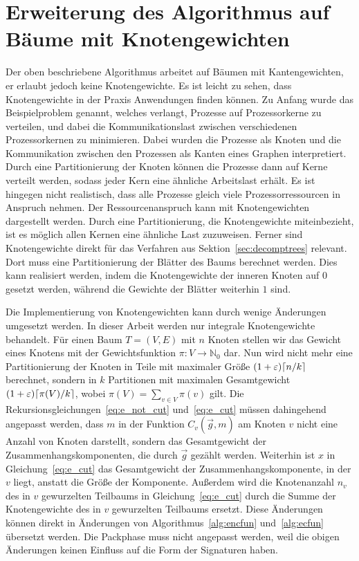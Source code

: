 \section{Erweiterung des Algorithmus auf Bäume mit Knotengewichten}\label{sec:nodeweights}
Der oben beschriebene Algorithmus arbeitet auf Bäumen mit Kantengewichten, er erlaubt jedoch keine Knotengewichte.
Es ist leicht zu sehen, dass Knotengewichte in der Praxis Anwendungen finden können.
Zu Anfang wurde das Beispielproblem genannt, welches verlangt, Prozesse auf Prozessorkerne zu verteilen, und dabei die Kommunikationslast zwischen verschiedenen Prozessorkernen zu minimieren.
Dabei wurden die Prozesse als Knoten und die Kommunikation zwischen den Prozessen als Kanten eines Graphen interpretiert.
Durch eine Partitionierung der Knoten können die Prozesse dann auf Kerne verteilt werden, sodass jeder Kern eine ähnliche Arbeitslast erhält.
Es ist hingegen nicht realistisch, dass alle Prozesse gleich viele Prozessorressourcen in Anspruch nehmen.
Der Ressourcenanspruch kann mit Knotengewichten dargestellt werden. 
Durch eine Partitionierung, die Knotengewichte miteinbezieht, ist es möglich allen Kernen eine ähnliche Last zuzuweisen.
Ferner sind Knotengewichte direkt für das Verfahren aus Sektion~\ref{sec:decomptrees} relevant. 
Dort muss eine Partitionierung der Blätter des Baums berechnet werden.
Dies kann realisiert werden, indem die Knotengewichte der inneren Knoten auf $0$ gesetzt werden, während die Gewichte der Blätter weiterhin $1$ sind.

Die Implementierung von Knotengewichten kann durch wenige Änderungen umgesetzt werden.
In dieser Arbeit werden nur integrale Knotengewichte behandelt.
Für einen Baum $T=(V,E)$ mit $n$ Knoten stellen wir das Gewicht eines Knotens mit der Gewichtsfunktion $\pi : V \rightarrow \mathbb{N}_0$ dar.
Nun wird nicht mehr eine Partitionierung der Knoten in Teile mit maximaler Größe $(1+\varepsilon) \lceil n/k\rceil$ berechnet, sondern in $k$ Partitionen mit maximalen Gesamtgewicht $(1+\varepsilon) \lceil\pi(V)/k\rceil$, wobei $\pi(V) = \sum_{v \in V} \pi(v)$ gilt.
Die Rekursionsgleichungen~\eqref{eq:e_not_cut} und~\eqref{eq:e_cut} müssen dahingehend angepasst werden, dass $m$ in der Funktion $C_v(\vec{g}, m)$ am Knoten $v$ nicht eine Anzahl von Knoten darstellt, sondern das Gesamtgewicht der Zusammenhangskomponenten, die durch $\vec{g}$ gezählt werden.
Weiterhin ist $x$ in Gleichung~\eqref{eq:e_cut} das Gesamtgewicht der Zusammenhangskomponente, in der $v$ liegt, anstatt die Größe der Komponente.
Außerdem wird die Knotenanzahl $n_v$ des in $v$ gewurzelten Teilbaums in Gleichung~\eqref{eq:e_cut} durch die Summe der Knotengewichte des in $v$ gewurzelten Teilbaums ersetzt.
Diese Änderungen können direkt in Änderungen von Algorithmus~\ref{alg:encfun} und~\ref{alg:ecfun} übersetzt werden.
Die Packphase muss nicht angepasst werden, weil die obigen Änderungen keinen Einfluss auf die Form der Signaturen haben.

